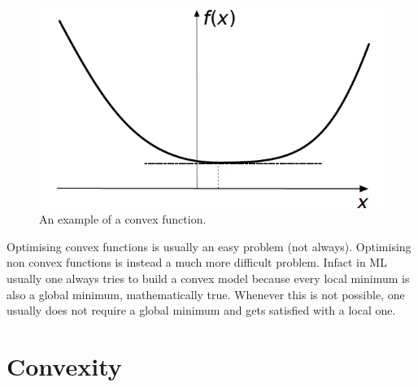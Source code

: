 \begin{figure}
    \centering
    \includegraphics[scale=0.3]{figures/2/chapter2-convex_function.png}
    \caption{An example of a convex function.}
    \label{fig:chapter2-convex_function}
\end{figure}
\par Optimising convex functions is usually an easy problem (not always). Optimising non convex functions is instead a much more difficult problem. Infact in ML usually one always tries to build a convex model because every local minimum is also a global minimum, mathematically true. Whenever this is not possible, one usually does not require a global minimum and gets satisfied with a local one.
%
%
%
\section{Convexity}
